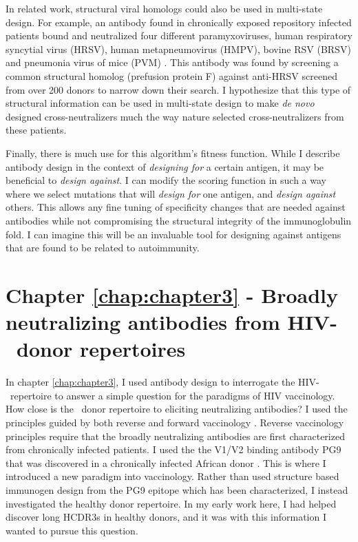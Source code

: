 In related work, structural viral homologs could also be used in multi-state design. For example, an antibody found in chronically exposed repository infected patients bound and neutralized four different paramyxoviruses, human respiratory syncytial virus (HRSV), human metapneumovirus (HMPV), bovine RSV (BRSV) and pneumonia virus of mice (PVM) \citep{Corti:2013cv}. This antibody was found by screening a common structural homolog (prefusion protein F) against anti-HRSV screened from over 200 donors to narrow down their search. I hypothesize that this type of structural information can be used in multi-state design to make \textit{de novo} designed cross-neutralizers much the way nature selected cross-neutralizers from these patients.

Finally, there is much use for this algorithm's fitness function. While I describe antibody design in the context of \textit{designing for} a certain antigen, it may be beneficial to \textit{design against}. I can modify the scoring function in such a way where we select mutations that will \textit{design for} one antigen, and \textit{design against} others. This allows any fine tuning of specificity changes that are needed against antibodies while not compromising the structural integrity of the immunoglobulin fold. I can imagine this will be an invaluable tool for designing against antigens that are found to be related to autoimmunity.

\section{Chapter \ref{chap:chapter3} - Broadly neutralizing antibodies from HIV-\naive~donor repertoires}
In chapter \ref{chap:chapter3}, I used antibody design to interrogate the HIV-\naive~repertoire to answer a simple question for the paradigms of HIV vaccinology. How close is the \naive~donor repertoire to eliciting neutralizing antibodies? I used the principles guided by both reverse  and forward vaccinology \citep{Burton:2012bh}. Reverse vaccinology principles require that the broadly neutralizing antibodies are first characterized from chronically infected patients. I used the the V1/V2 binding antibody PG9 that was discovered in a chronically infected African donor \citep{McLellan:2011dg,Walker:2009cd}. This is where I introduced a new paradigm into vaccinology. Rather than used structure based immunogen design from the PG9 epitope which has been characterized, I instead investigated the healthy donor repertoire. In my early work here, I had helped discover long HCDR3s in healthy donors, and it was with this information I wanted to pursue this question.

